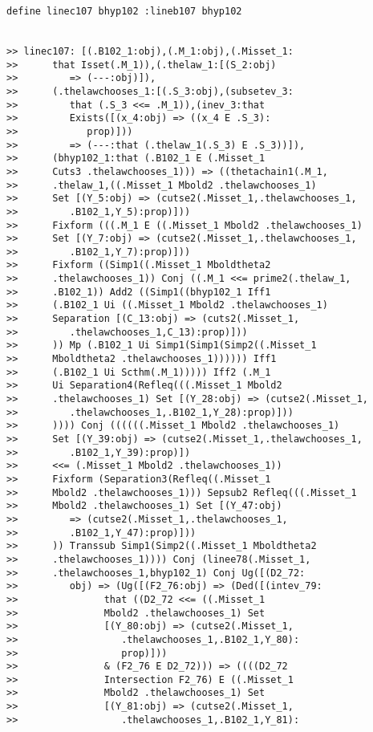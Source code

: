 \documentclass[12pt]{article}
\begin{document}
\begin{verbatim}
define linec107 bhyp102 :lineb107 bhyp102


>> linec107: [(.B102_1:obj),(.M_1:obj),(.Misset_1:
>>      that Isset(.M_1)),(.thelaw_1:[(S_2:obj)
>>         => (---:obj)]),
>>      (.thelawchooses_1:[(.S_3:obj),(subsetev_3:
>>         that (.S_3 <<= .M_1)),(inev_3:that
>>         Exists([(x_4:obj) => ((x_4 E .S_3):
>>            prop)]))
>>         => (---:that (.thelaw_1(.S_3) E .S_3))]),
>>      (bhyp102_1:that (.B102_1 E (.Misset_1
>>      Cuts3 .thelawchooses_1))) => ((thetachain1(.M_1,
>>      .thelaw_1,((.Misset_1 Mbold2 .thelawchooses_1)
>>      Set [(Y_5:obj) => (cutse2(.Misset_1,.thelawchooses_1,
>>         .B102_1,Y_5):prop)]))
>>      Fixform (((.M_1 E ((.Misset_1 Mbold2 .thelawchooses_1)
>>      Set [(Y_7:obj) => (cutse2(.Misset_1,.thelawchooses_1,
>>         .B102_1,Y_7):prop)]))
>>      Fixform ((Simp1((.Misset_1 Mboldtheta2
>>      .thelawchooses_1)) Conj ((.M_1 <<= prime2(.thelaw_1,
>>      .B102_1)) Add2 ((Simp1((bhyp102_1 Iff1
>>      (.B102_1 Ui ((.Misset_1 Mbold2 .thelawchooses_1)
>>      Separation [(C_13:obj) => (cuts2(.Misset_1,
>>         .thelawchooses_1,C_13):prop)]))
>>      )) Mp (.B102_1 Ui Simp1(Simp1(Simp2((.Misset_1
>>      Mboldtheta2 .thelawchooses_1)))))) Iff1
>>      (.B102_1 Ui Scthm(.M_1))))) Iff2 (.M_1
>>      Ui Separation4(Refleq(((.Misset_1 Mbold2
>>      .thelawchooses_1) Set [(Y_28:obj) => (cutse2(.Misset_1,
>>         .thelawchooses_1,.B102_1,Y_28):prop)]))
>>      )))) Conj ((((((.Misset_1 Mbold2 .thelawchooses_1)
>>      Set [(Y_39:obj) => (cutse2(.Misset_1,.thelawchooses_1,
>>         .B102_1,Y_39):prop)])
>>      <<= (.Misset_1 Mbold2 .thelawchooses_1))
>>      Fixform (Separation3(Refleq((.Misset_1
>>      Mbold2 .thelawchooses_1))) Sepsub2 Refleq(((.Misset_1
>>      Mbold2 .thelawchooses_1) Set [(Y_47:obj)
>>         => (cutse2(.Misset_1,.thelawchooses_1,
>>         .B102_1,Y_47):prop)]))
>>      )) Transsub Simp1(Simp2((.Misset_1 Mboldtheta2
>>      .thelawchooses_1)))) Conj (linee78(.Misset_1,
>>      .thelawchooses_1,bhyp102_1) Conj Ug([(D2_72:
>>         obj) => (Ug([(F2_76:obj) => (Ded([(intev_79:
>>               that ((D2_72 <<= ((.Misset_1
>>               Mbold2 .thelawchooses_1) Set
>>               [(Y_80:obj) => (cutse2(.Misset_1,
>>                  .thelawchooses_1,.B102_1,Y_80):
>>                  prop)]))
>>               & (F2_76 E D2_72))) => ((((D2_72
>>               Intersection F2_76) E ((.Misset_1
>>               Mbold2 .thelawchooses_1) Set
>>               [(Y_81:obj) => (cutse2(.Misset_1,
>>                  .thelawchooses_1,.B102_1,Y_81):

\end{verbatim}
\end{document}
